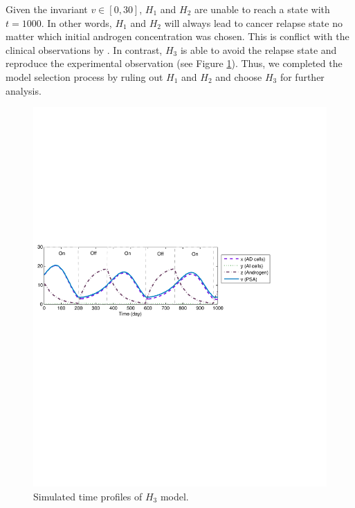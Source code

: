 Given the invariant $v \in [0,30]$, $H_1$ and $H_2$ are unable to reach a state with $t=1000$. In other words, $H_1$ and $H_2$ will always lead to cancer relapse state no matter which initial androgen concentration was chosen. This is conflict with the clinical observations by \cite{bruchovsky06,bruchovsky07}. In contrast, $H_3$ is able to avoid the relapse state and reproduce the experimental observation (see Figure \ref{prostate-fig1}). Thus, we completed the model selection process by ruling out $H_1$ and $H_2$ and choose $H_3$ for further analysis.


\begin{figure}[htb]
\centering
\includegraphics[scale=0.5]{fig-prostatetraj}
\caption{Simulated time profiles of $H_3$ model.}
\label{prostate-fig1}
 \vspace{-0.7cm}
\end{figure}

